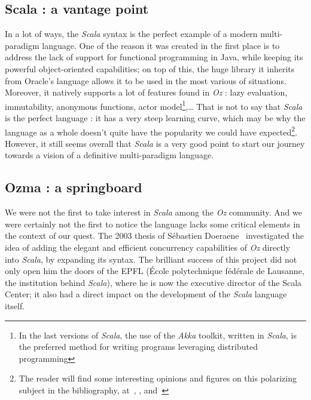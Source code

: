 \subsection{Scala : a vantage point}\label{subsec:ch1-scala}
In a lot of ways, the \textit{Scala} syntax is the perfect example of a modern multi-paradigm language.
One of the reason it was created in the first place is to address the lack of support for functional programming in Java, while keeping its powerful object-oriented capabilities;
on top of this, the huge library it inherits from Oracle's language allows it to be used in the most various of situations.\newline
Moreover, it natively supports a lot of features found in \textit{Oz} : lazy evaluation, immutability, anonymous functions, actor model\footnote{In the last versions of \textit{Scala}, the use of the \textit{Akka} toolkit\cite{akka}, written in \textit{Scala}, is the preferred method for writing programs leveraging distributed programming},\ldots
That is not to say that \textit{Scala} is the perfect language :
it has a very steep learning curve, which may be why the language as a whole doesn't quite have the popularity we could have expected\footnote{The reader will find some interesting opinions and figures on this polarizing subject in the bibliography, at~\cite{scalaOpinion1}, \cite{scalaOpinion2}, and~\cite{tiobeindex}}.
However, it still seems overall that \textit{Scala} is a very good point to start our journey towards a vision of a definitive multi-paradigm language.

\subsection{Ozma : a springboard}\label{subsec:ch1-ozma}
We were not the first to take interest in \textit{Scala} among the \textit{Oz} community.
And we were certainly not the first to notice the language lacks some critical elements in the context of our quest.\newline
The 2003 thesis of Sébastien Doeraene~\cite{Ozma} investigated the idea of adding the elegant and efficient concurrency capabilities of \textit{Oz} directly into \textit{Scala}, by expanding its syntax.
The brilliant success of this project did not only open him the doors of the EPFL (École polytechnique fédérale de Lausanne, the institution behind \textit{Scala}), where he is now the executive director of the Scala Center;
it also had a direct impact on the development of the \textit{Scala} language itself.\newline

